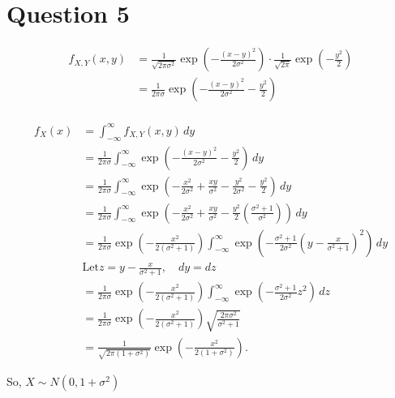 \documentclass{article}
\begin{document}
\section*{Question 5}

\begin{align*}   
f_{X,Y}(x, y)  &= \frac{1}{\sqrt{2\pi \sigma^2}} \exp\left(-\frac{(x - y)^2}{2\sigma^2}\right) \cdot \frac{1}{\sqrt{2\pi}} \exp\left(-\frac{y^2}{2}\right) \\
&= \frac{1}{2\pi \sigma} \exp\left(-\frac{(x - y)^2}{2\sigma^2} - \frac{y^2}{2}\right) \\
\end{align*}



\begin{align*}
f_X(x) &= \int_{-\infty}^{\infty} f_{X,Y}(x, y) \, dy \\
&= \frac{1}{2\pi\sigma} \int_{-\infty}^{\infty} \exp \left(-\frac{(x - y)^2}{2\sigma^2} - \frac{y^2}{2}\right) \, dy \\
&= \frac{1}{2\pi\sigma} \int_{-\infty}^{\infty} \exp \left(-\frac{x^2}{2\sigma^2} + \frac{xy}{\sigma^2} - \frac{y^2}{2\sigma^2} - \frac{y^2}{2}\right) \, dy \\
&= \frac{1}{2\pi\sigma} \int_{-\infty}^{\infty} \exp \left(-\frac{x^2}{2\sigma^2} + \frac{xy}{\sigma^2} - \frac{y^2}{2} \left(\frac{\sigma^2 + 1}{\sigma^2}\right)\right) \, dy \\
&= \frac{1}{2\pi\sigma} \exp\left(-\frac{x^2}{2(\sigma^2 + 1)}\right) \int_{-\infty}^{\infty} \exp \left(-\frac{\sigma^2 + 1}{2\sigma^2} \left(y - \frac{x}{\sigma^2 + 1}\right)^2\right) \, dy \\
&\text{Let}  z = y - \frac{x}{\sigma^2 + 1}, \quad dy = dz \\
&= \frac{1}{2\pi\sigma} \exp\left(-\frac{x^2}{2(\sigma^2 + 1)}\right) \int_{-\infty}^{\infty} \exp\left(-\frac{\sigma^2 + 1}{2\sigma^2} z^2\right) \, dz \\
&= \frac{1}{2\pi\sigma} \exp\left(-\frac{x^2}{2(\sigma^2 + 1)}\right) \sqrt{\frac{2\pi\sigma^2}{\sigma^2 + 1}} \\
&= \frac{1}{\sqrt{2\pi(1 + \sigma^2)}} \exp\left(-\frac{x^2}{2(1 + \sigma^2)}\right).
\end{align*}

So,
\(
X \sim N(0, 1 + \sigma^2)
\)
\end{document}
